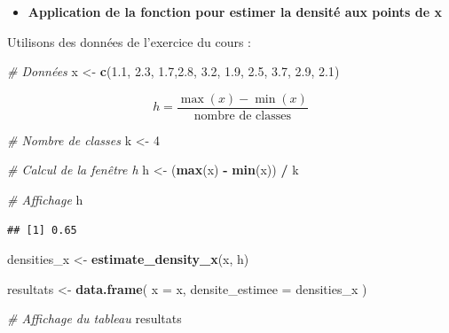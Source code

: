 \documentclass[
  12pt,
]{article}
\newenvironment{Shaded}{\begin{snugshade}}{\end{snugshade}}
\newcommand{\AttributeTok}[1]{\textcolor[rgb]{0.13,0.29,0.53}{#1}}
\newcommand{\CommentTok}[1]{\textcolor[rgb]{0.56,0.35,0.01}{\textit{#1}}}
\newcommand{\DecValTok}[1]{\textcolor[rgb]{0.00,0.00,0.81}{#1}}
\newcommand{\FloatTok}[1]{\textcolor[rgb]{0.00,0.00,0.81}{#1}}
\newcommand{\FunctionTok}[1]{\textcolor[rgb]{0.13,0.29,0.53}{\textbf{#1}}}
\newcommand{\NormalTok}[1]{#1}
\newcommand{\OtherTok}[1]{\textcolor[rgb]{0.56,0.35,0.01}{#1}}
\newcommand{\SpecialCharTok}[1]{\textcolor[rgb]{0.81,0.36,0.00}{\textbf{#1}}}
\providecommand{\tightlist}{%
  \setlength{\itemsep}{0pt}\setlength{\parskip}{0pt}}
\begin{document}
\begin{itemize}
\tightlist
\item
  \textbf{Application de la fonction pour estimer la densité aux points
  de x}
\end{itemize}

Utilisons des données de l'exercice du cours :

\begin{Shaded}
\begin{Highlighting}[]
\CommentTok{\# Données}
\NormalTok{x }\OtherTok{\textless{}{-}} \FunctionTok{c}\NormalTok{(}\FloatTok{1.1}\NormalTok{, }\FloatTok{2.3}\NormalTok{, }\FloatTok{1.7}\NormalTok{,}\FloatTok{2.8}\NormalTok{, }\FloatTok{3.2}\NormalTok{, }\FloatTok{1.9}\NormalTok{, }\FloatTok{2.5}\NormalTok{, }\FloatTok{3.7}\NormalTok{, }\FloatTok{2.9}\NormalTok{, }\FloatTok{2.1}\NormalTok{)}
\end{Highlighting}
\end{Shaded}

\[
h = \frac{\max(x) - \min(x)}{\text{nombre de classes}}
\]

\begin{Shaded}
\begin{Highlighting}[]
\CommentTok{\# Nombre de classes}
\NormalTok{k }\OtherTok{\textless{}{-}} \DecValTok{4}

\CommentTok{\# Calcul de la fenêtre h}
\NormalTok{h }\OtherTok{\textless{}{-}}\NormalTok{ (}\FunctionTok{max}\NormalTok{(x) }\SpecialCharTok{{-}} \FunctionTok{min}\NormalTok{(x)) }\SpecialCharTok{/}\NormalTok{ k}

\CommentTok{\# Affichage}
\NormalTok{h}
\end{Highlighting}
\end{Shaded}

\begin{verbatim}
## [1] 0.65
\end{verbatim}

\begin{Shaded}
\begin{Highlighting}[]
\NormalTok{densities\_x }\OtherTok{\textless{}{-}} \FunctionTok{estimate\_density\_x}\NormalTok{(x, h)}

\NormalTok{resultats }\OtherTok{\textless{}{-}} \FunctionTok{data.frame}\NormalTok{(}
  \AttributeTok{x =}\NormalTok{ x,}
  \AttributeTok{densite\_estimee =}\NormalTok{ densities\_x}
\NormalTok{)}

\CommentTok{\# Affichage du tableau}
\NormalTok{resultats}
\end{Highlighting}
\end{Shaded}
\end{document}
